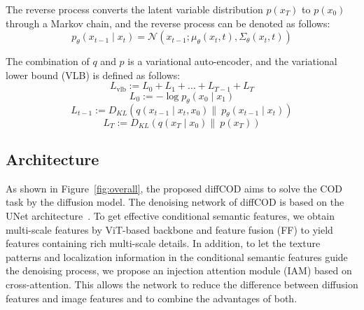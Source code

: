 \documentclass{ecai}
\begin{document}
The reverse process converts the latent variable distribution $p(x_{T})$ to $p(x_{0})$ through a Markov chain, and the reverse process can be denoted as follows:
\begin{equation}
    p_{\theta}\left(x_{t-1} \mid x_{t}\right)=\mathcal{N}\left(x_{t-1} ; \mu_{\theta}\left(x_{t}, t\right), \Sigma_{\theta}\left(x_{t}, t\right)\right)
\end{equation}

The combination of $q$ and $p$ is a variational auto-encoder, and the variational lower bound (VLB) is defined as follows:
\begin{equation}
    L_{\mathrm{vlb}}:=L_{0}+L_{1}+\ldots+L_{T-1}+L_{T}
    \label{Loss1}
\end{equation}
\begin{equation}
    L_{0}:=-\log p_{\theta}\left(x_{0} \mid x_{1}\right)
    \label{Loss2}
\end{equation}
\begin{equation}
    L_{t-1}:=D_{K L}\left(q\left(x_{t-1} \mid x_t, x_0\right) \|\ p_\theta\left(x_{t-1} \mid x_t\right)\right)
    \label{Loss3}
\end{equation}
\begin{equation}
    L_T:=D_{K L}\left(q\left(x_T \mid x_0\right) \|\ p\left(x_T\right)\right)
    \label{Loss4}
\end{equation}


\subsection{Architecture}
\label{diffCOD}
As shown in Figure~\ref{fig:overall}, the proposed diffCOD aims to solve the COD task by the diffusion model. The denoising network of diffCOD is based on the UNet architecture~\cite{ronneberger2015u}. To get effective conditional semantic features, we obtain multi-scale features by ViT-based backbone and feature fusion (FF) to yield features containing rich multi-scale details. In addition, to let the texture patterns and localization information in the conditional semantic features guide the denoising process, we propose an injection attention module (IAM) based on cross-attention. This allows the network to reduce the difference between diffusion features and image features and to combine the advantages of both.
\end{document}
